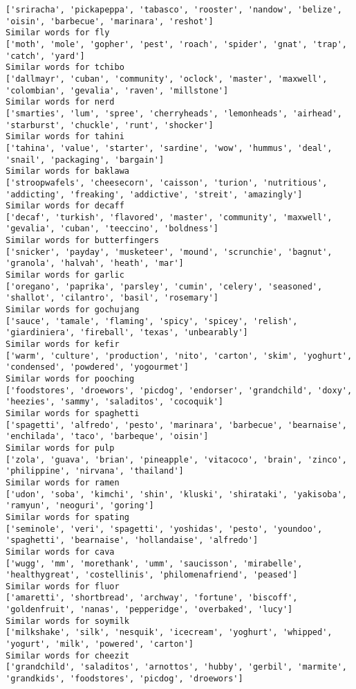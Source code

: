 \documentclass[11pt]{article}
\begin{document}
\begin{Verbatim}[commandchars=\\\{\}]
['sriracha', 'pickapeppa', 'tabasco', 'rooster', 'nandow', 'belize', 'oisin', 'barbecue', 'marinara', 'reshot']
Similar words for fly
['moth', 'mole', 'gopher', 'pest', 'roach', 'spider', 'gnat', 'trap', 'catch', 'yard']
Similar words for tchibo
['dallmayr', 'cuban', 'community', 'oclock', 'master', 'maxwell', 'colombian', 'gevalia', 'raven', 'millstone']
Similar words for nerd
['smarties', 'lum', 'spree', 'cherryheads', 'lemonheads', 'airhead', 'starburst', 'chuckle', 'runt', 'shocker']
Similar words for tahini
['tahina', 'value', 'starter', 'sardine', 'wow', 'hummus', 'deal', 'snail', 'packaging', 'bargain']
Similar words for baklawa
['stroopwafels', 'cheesecorn', 'caisson', 'turion', 'nutritious', 'addicting', 'freaking', 'addictive', 'streit', 'amazingly']
Similar words for decaff
['decaf', 'turkish', 'flavored', 'master', 'community', 'maxwell', 'gevalia', 'cuban', 'teeccino', 'boldness']
Similar words for butterfingers
['snicker', 'payday', 'musketeer', 'mound', 'scrunchie', 'bagnut', 'granola', 'halvah', 'heath', 'mar']
Similar words for garlic
['oregano', 'paprika', 'parsley', 'cumin', 'celery', 'seasoned', 'shallot', 'cilantro', 'basil', 'rosemary']
Similar words for gochujang
['sauce', 'tamale', 'flaming', 'spicy', 'spicey', 'relish', 'giardiniera', 'fireball', 'texas', 'unbearably']
Similar words for kefir
['warm', 'culture', 'production', 'nito', 'carton', 'skim', 'yoghurt', 'condensed', 'powdered', 'yogourmet']
Similar words for pooching
['foodstores', 'droewors', 'picdog', 'endorser', 'grandchild', 'doxy', 'heezies', 'sammy', 'saladitos', 'cocoquik']
Similar words for spaghetti
['spagetti', 'alfredo', 'pesto', 'marinara', 'barbecue', 'bearnaise', 'enchilada', 'taco', 'barbeque', 'oisin']
Similar words for pulp
['zola', 'guava', 'brian', 'pineapple', 'vitacoco', 'brain', 'zinco', 'philippine', 'nirvana', 'thailand']
Similar words for ramen
['udon', 'soba', 'kimchi', 'shin', 'kluski', 'shirataki', 'yakisoba', 'ramyun', 'neoguri', 'goring']
Similar words for spating
['seminole', 'veri', 'spagetti', 'yoshidas', 'pesto', 'youndoo', 'spaghetti', 'bearnaise', 'hollandaise', 'alfredo']
Similar words for cava
['wugg', 'mm', 'morethank', 'umm', 'saucisson', 'mirabelle', 'healthygreat', 'costellinis', 'philomenafriend', 'peased']
Similar words for fluor
['amaretti', 'shortbread', 'archway', 'fortune', 'biscoff', 'goldenfruit', 'nanas', 'pepperidge', 'overbaked', 'lucy']
Similar words for soymilk
['milkshake', 'silk', 'nesquik', 'icecream', 'yoghurt', 'whipped', 'yogurt', 'milk', 'powered', 'carton']
Similar words for cheezit
['grandchild', 'saladitos', 'arnottos', 'hubby', 'gerbil', 'marmite', 'grandkids', 'foodstores', 'picdog', 'droewors']

\end{Verbatim}
\end{document}
